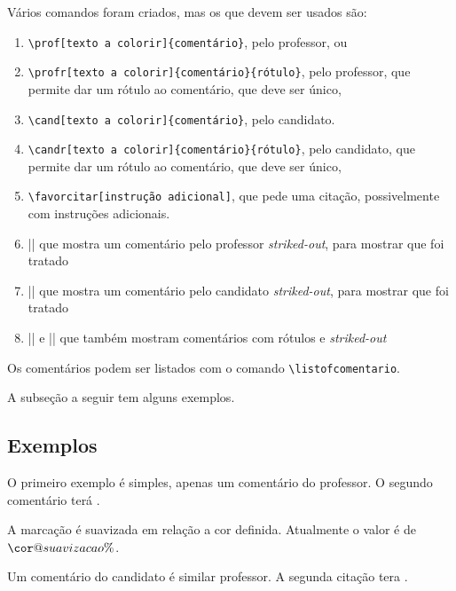 \documentclass{article}
\begin{document}
    Vários comandos foram criados, mas os que devem ser usados são:
    \begin{enumerate}
        \item \verb!\prof[texto a colorir]{comentário}!, pelo professor, ou
        \item \verb!\profr[texto a colorir]{comentário}{rótulo}!, pelo professor, que permite dar um rótulo ao comentário, que deve ser único,
        \item \verb!\cand[texto a colorir]{comentário}!, pelo candidato.
        \item \verb!\candr[texto a colorir]{comentário}{rótulo}!, pelo candidato, que permite dar um rótulo ao comentário, que deve ser único,
        \item \verb!\favorcitar[instrução adicional]!, que pede uma citação, possivelmente com instruções adicionais.
        \item || que mostra um comentário pelo professor \textit{striked-out}, para mostrar que foi tratado
        \item || que mostra um comentário pelo candidato \textit{striked-out}, para mostrar que foi tratado
        \item |\profrx| e |\candrx| que também mostram comentários com rótulos e \textit{striked-out}
    \end{enumerate}
    
    Os comentários podem ser listados com o comando \verb!\listofcomentario!.
    
    A subseção a seguir  tem alguns exemplos.
    
    \subsection{Exemplos}
    
    O primeiro exemplo é simples, apenas um comentário do professor.
    O segundo comentário terá .
    
    A marcação é suavizada em relação a cor definida. Atualmente o valor é de \makeatletter$\cor@suavizacao\%$\makeatother.
    
    Um comentário do candidato é similar professor. A segunda citação tera .
    
\end{document}
